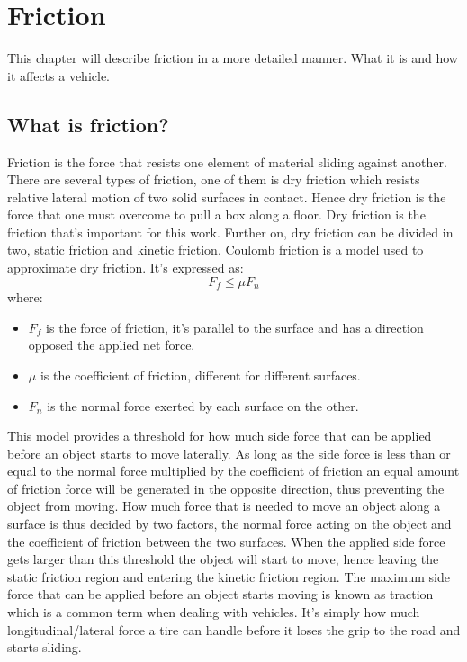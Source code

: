 \chapter{Friction}
This chapter will describe friction in a more detailed manner. What it is and how it affects a vehicle.

\section{What is friction?}
Friction is the force that resists one element of material sliding against another. There are several types of friction, one of them is dry friction which resists relative lateral motion of two solid surfaces in contact. Hence dry friction is the force that one must overcome to pull a box along a floor. Dry friction is the friction that's important for this work. Further on, dry friction can be divided in two, static friction and kinetic friction. Coulomb friction is a model used to approximate dry friction. It's expressed as:
\begin{equation} \label{eq:friction}
F_{f}\leq\mu F_{n}
\end{equation}
where:
\begin{itemize}
	\item $ F_{f} $ is the force of friction, it's parallel to the surface and has a direction opposed the applied net force.
	\item $ \mu $ is the coefficient of friction, different for different surfaces.
	\item $ F_{n} $ is the normal force exerted by each surface on the other.
\end{itemize}
This model provides a threshold for how much side force that can be applied before an object starts to move laterally. As long as the side force is less than or equal to the normal force multiplied by the coefficient of friction an equal amount of friction force will be generated in the opposite direction, thus preventing the object from moving. How much force that is needed to move an object along a surface is thus decided by two factors, the normal force acting on the object and the coefficient of friction between the two surfaces. When the applied side force gets larger than this threshold the object will start to move, hence leaving the static friction region and entering the kinetic friction region. The maximum side force that can be applied before an object starts moving is known as traction which is a common term when dealing with vehicles. It's simply how much longitudinal/lateral force a tire can handle before it loses the grip to the road and starts sliding.

